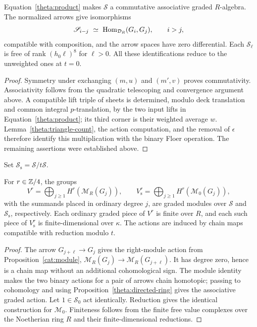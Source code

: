 \begin{proposition}\label{theta:directed-ring}
Equation~\eqref{theta:product} makes $\mathscr S$ a commutative associative
graded $R$-algebra.  The normalized arrows give isomorphisms
\[
 \mathscr S_{i-j}\ \simeq\
       \operatorname{Hom}_{\mathcal D_R}(G_i,G_j),\qquad i>j,
\]
compatible with composition, and the arrow spaces have zero differential.
Each $\mathscr S_\ell$ is free of rank $(h_0\ell)^8$ for $\ell>0$.
All these identifications reduce to the unweighted ones at $t=0$.
\end{proposition}

\begin{proof}
Symmetry under exchanging $(m,u)$ and $(m',v)$ proves commutativity.
Associativity follows from the quadratic telescoping and convergence
argument above.  A compatible lift triple of sheets is determined, modulo
deck translation and common integral $p$-translation, by the two input
lifts in Equation~\eqref{theta:product}; its third corner is their weighted
average $w$.  Lemma~\ref{theta:triangle-count}, the action computation, and
the removal of $\epsilon$ therefore identify this multiplication with the
binary Floer operation.  The remaining assertions were established above.
\end{proof}

Set $\mathscr S_{\mathrm s}=\mathscr S/t\mathscr S$.
\begin{proposition}\label{theta:modules}
For $r\in\mathbb Z/4$, the groups
\begin{equation}\label{theta:module-definition}
 V^r=\bigoplus_{j\geq1}H^r(\mathcal M_R(G_j)),\qquad
 V_{\mathrm s}^r=\bigoplus_{j\geq1}H^r(\mathcal M_0(G_j)),
\end{equation}
with the summands placed in ordinary degree $j$, are graded modules over
$\mathscr S$ and $\mathscr S_{\mathrm s}$, respectively.  Each ordinary
graded piece of $V^r$ is finite over $R$, and each such piece of
$V_{\mathrm s}^r$ is finite-dimensional over $\kappa$.  The actions are
induced by chain maps compatible with reduction modulo $t$.
\end{proposition}

\begin{proof}
The arrow $G_{j+\ell}\to G_j$ gives the right-module action from
Proposition~\ref{cat:module},
$\mathcal M_R(G_j)\to\mathcal M_R(G_{j+\ell})$.  It has degree zero, hence
is a chain map without an additional cohomological sign.  The module
identity makes the two binary actions for a pair of arrows chain
homotopic; passing to cohomology and using
Proposition~\ref{theta:directed-ring} gives the associative graded action.
Let $1\in\mathscr S_0$ act identically.  Reduction gives the identical
construction for $\mathcal M_0$.  Finiteness follows from the finite free
value complexes over the Noetherian ring $R$ and their finite-dimensional
reductions.
\end{proof}

